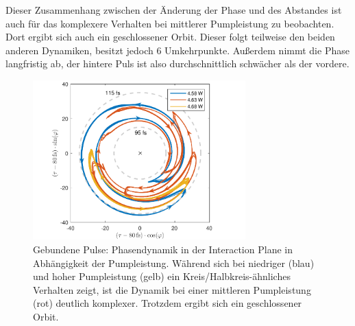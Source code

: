 \documentclass[bachelor,       %
               twoside,        %
               BCOR10mm,       %
               liststotoc,nomtotoc,bibtotoc, %
               english,ngerman, %
               final,          %
               ]{GAUBM}
\begin{document}
Dieser Zusammenhang zwischen der Änderung der Phase und des Abstandes ist auch für das komplexere Verhalten bei mittlerer Pumpleistung zu beobachten.
Dort ergibt sich auch ein geschlossener Orbit.
Dieser folgt teilweise den beiden anderen Dynamiken, besitzt jedoch 6 Umkehrpunkte.
Außerdem nimmt die Phase langfristig ab, der hintere Puls ist also durchschnittlich schwächer als der vordere.
 \begin{figure}[!htb]
	\centering
	\includegraphics[width=0.73\textwidth]{figures/4ms_25GSA_400m_MLrun_runBounceFix_InteractionPlaneArrows_final2.pdf}
	\caption{Gebundene Pulse: Phasendynamik in der Interaction Plane  in Abhängigkeit der Pumpleistung.
	Während sich bei niedriger (blau) und hoher Pumpleistung (gelb) ein Kreis/Halbkreis-ähnliches Verhalten zeigt, ist die Dynamik bei einer mittleren Pumpleistung (rot) deutlich komplexer. Trotzdem ergibt sich ein geschlossener Orbit.}
	\label{fig:interactionPlane}
\end{figure}
\end{document}
